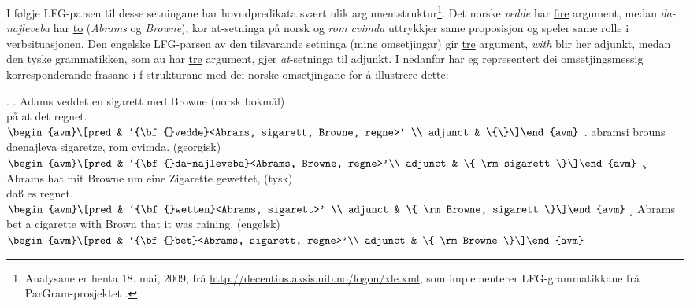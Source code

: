 \documentclass[11pt,a4paper,oneside,draft]{book}
\begin{document}
I følgje LFG-parsen til desse setningane har hovudpredikata svært ulik
argumentstruktur\footnote{Analysane er henta 18. mai, 2009, frå
        \href{http://decentius.aksis.uib.no/logon/xle.xml}{http://decentius.aksis.uib.no/logon/xle.xml}, som implementerer
        LFG-grammatikkane frå ParGram-prosjektet \citep{butt2002pgp}. }. Det norske \emph{vedde} har \underline{fire} argument, medan
\emph{da-najleveba} har \underline{to} (\emph{Abrams} og \emph{Browne}), kor at-setninga på
norsk og \emph{rom cvimda} uttrykkjer same proposisjon og speler same rolle
i verbsituasjonen. Den engelske LFG-parsen av den tilsvarande setninga
(mine omsetjingar) gir \underline{tre} argument, \emph{with} blir her adjunkt, medan
den tyske grammatikken, som au har \underline{tre} argument, gjer \emph{at}-setninga
til adjunkt. I \Next nedanfor har eg representert dei omsetjingsmessig
korresponderande frasane i f-strukturane med dei norske omsetjingane
for å illustrere dette:

{\avmoptions{}
\ex. \label{vedde}
\a. Adams veddet en sigarett med Browne \hfill{} (norsk bokmål)\\ på at det regnet.\\
    $\\\begin{avm}\[pred & `{\bf{}vedde}<Abrams, sigarett, Browne, regne>' \\
                 adjunct & \{\}\]\end{avm}\\$
\b. abramsi brouns daenajleva sigaretze, rom cvimda. \hfill{} (georgisk)\\
    $\\\begin{avm}\[pred &  `{\bf{}da-najleveba}<Abrams, Browne, regne>'\\
    adjunct &  \{ \rm sigarett \}\]\end{avm}\\$ 
\c. Abrams hat mit Browne um eine Zigarette gewettet, \hfill{}(tysk)\\
    daß es regnet.\\
    $\\\begin{avm}\[pred & `{\bf{}wetten}<Abrams, sigarett>' \\
                  adjunct & \{ \rm Browne, sigarett \}\]\end{avm}\\$
\d. Abrams bet a cigarette with Brown that it was raining. \hfill{}(engelsk)\\
    $\\\begin{avm}\[pred & `{\bf{}bet}<Abrams, sigarett, regne>'\\
                  adjunct & \{ \rm Browne \}\]\end{avm}$

}
\end{document}
